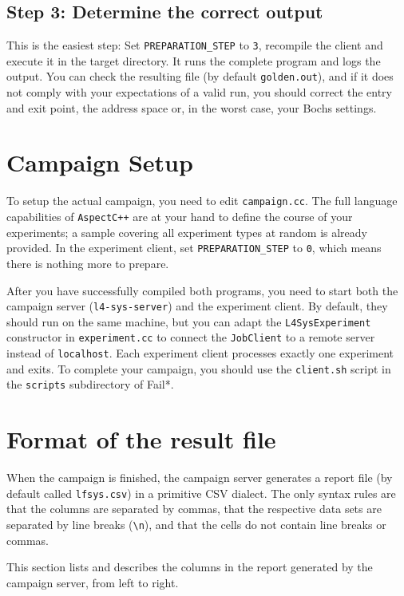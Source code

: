 \documentclass[a4paper,times,9pt]{article}
\begin{document}
\subsection{Step 3: Determine the correct output}

This is the easiest step: Set \verb+PREPARATION_STEP+ to \texttt{3},
recompile the client and execute it in the target directory.
It runs the complete program and logs the output. You can
check the resulting file (by default \texttt{golden.out}),
and if it does not comply with your expectations of a valid
run, you should correct the entry and exit point, the address space
or, in the worst case, your Bochs settings.

\section{Campaign Setup}

To setup the actual campaign, you need to edit \texttt{campaign.cc}.
The full language capabilities of \texttt{AspectC++} are at your hand to define
the course of your experiments; a sample covering all experiment
types at random is already provided. In the experiment client,
set \verb+PREPARATION_STEP+ to \texttt{0}, which means there is nothing more
to prepare.

After you have successfully compiled both programs, you need to
start both the campaign server (\texttt{l4-sys-server})
and the experiment client. By default, they should run on the
same machine, but you can adapt the \texttt{L4SysExperiment}
constructor in \texttt{experiment.cc} to connect the \texttt{JobClient}
to a remote server instead of \texttt{localhost}. Each experiment client processes
exactly one experiment and exits. To complete your campaign,
you should use the \texttt{client.sh} script in the \texttt{scripts}
subdirectory of Fail*.

\section{Format of the result file}

When the campaign is finished, the campaign server generates a report
file (by default called \texttt{lfsys.csv}) in a primitive CSV dialect.
The only syntax rules are that the columns are separated by commas,
that the respective data sets are separated by line breaks (\verb+\n+),
and that the cells do not contain line breaks or commas.

This section lists and describes the columns in the report generated by
the campaign server, from left to right.
\end{document}
